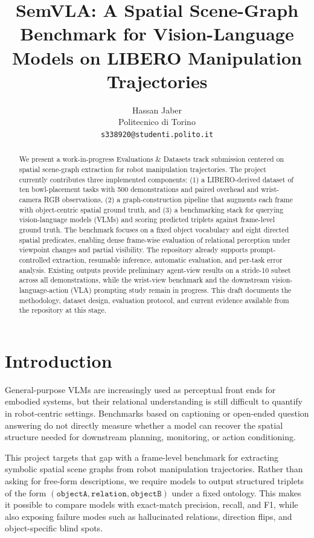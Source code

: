 \documentclass{article}
\title{SemVLA: A Spatial Scene-Graph Benchmark for Vision-Language Models on LIBERO Manipulation Trajectories}
\author{%
  Hassan Jaber \\
  Politecnico di Torino \\
  \texttt{s338920@studenti.polito.it}
}
\begin{document}
\maketitle

\begin{abstract}
We present a work-in-progress Evaluations \& Datasets track submission centered on spatial scene-graph extraction for robot manipulation trajectories. The project currently contributes three implemented components: (1) a LIBERO-derived dataset of ten bowl-placement tasks with 500 demonstrations and paired overhead and wrist-camera RGB observations, (2) a graph-construction pipeline that augments each frame with object-centric spatial ground truth, and (3) a benchmarking stack for querying vision-language models (VLMs) and scoring predicted triplets against frame-level ground truth. The benchmark focuses on a fixed object vocabulary and eight directed spatial predicates, enabling dense frame-wise evaluation of relational perception under viewpoint changes and partial visibility. The repository already supports prompt-controlled extraction, resumable inference, automatic evaluation, and per-task error analysis. Existing outputs provide preliminary agent-view results on a stride-10 subset across all demonstrations, while the wrist-view benchmark and the downstream vision-language-action (VLA) prompting study remain in progress. This draft documents the methodology, dataset design, evaluation protocol, and current evidence available from the repository at this stage.
\end{abstract}

\section{Introduction}
General-purpose VLMs are increasingly used as perceptual front ends for embodied systems, but their relational understanding is still difficult to quantify in robot-centric settings. Benchmarks based on captioning or open-ended question answering do not directly measure whether a model can recover the spatial structure needed for downstream planning, monitoring, or action conditioning.

This project targets that gap with a frame-level benchmark for extracting symbolic spatial scene graphs from robot manipulation trajectories. Rather than asking for free-form descriptions, we require models to output structured triplets of the form $(\texttt{objectA}, \texttt{relation}, \texttt{objectB})$ under a fixed ontology. This makes it possible to compare models with exact-match precision, recall, and F1, while also exposing failure modes such as hallucinated relations, direction flips, and object-specific blind spots.
\end{document}
